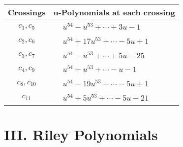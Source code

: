 \documentclass[1p]{elsarticle_modified}
\theoremstyle{definition}
\begin{document}
\begin{tabular}{m{50pt}|m{274pt}}
Crossings & \hspace{64pt}u-Polynomials at each crossing \\
\hline $$\begin{aligned}c_{1},c_{5}\end{aligned}$$&$\begin{aligned}
&u^{54}- u^{53}+\cdots+3 u-1
\end{aligned}$\\
\hline $$\begin{aligned}c_{2},c_{6}\end{aligned}$$&$\begin{aligned}
&u^{54}+17 u^{53}+\cdots-5 u+1
\end{aligned}$\\
\hline $$\begin{aligned}c_{3},c_{7}\end{aligned}$$&$\begin{aligned}
&u^{54}- u^{53}+\cdots+5 u-25
\end{aligned}$\\
\hline $$\begin{aligned}c_{4},c_{9}\end{aligned}$$&$\begin{aligned}
&u^{54}+u^{53}+\cdots- u-1
\end{aligned}$\\
\hline $$\begin{aligned}c_{8},c_{10}\end{aligned}$$&$\begin{aligned}
&u^{54}-19 u^{53}+\cdots-5 u+1
\end{aligned}$\\
\hline $$\begin{aligned}c_{11}\end{aligned}$$&$\begin{aligned}
&u^{54}+5 u^{53}+\cdots-5 u-21
\end{aligned}$\\
\hline
\end{tabular}\newpage\renewcommand{\arraystretch}{1}
\centering \section*{ III. Riley Polynomials}
\end{document}

